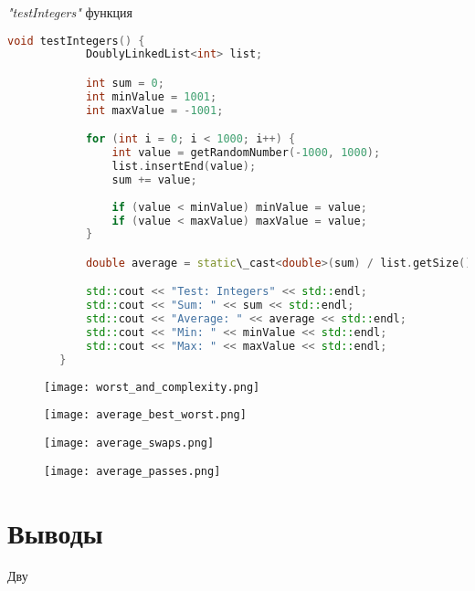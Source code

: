 \documentclass[12pt, a4paper]{report}
\begin{document}
	\par
	\textit{"testIntegers"} функция
	\lstset{style=mystyle}
	\begin{lstlisting}[language=C++]
		void testIntegers() {
			DoublyLinkedList<int> list;

			int sum = 0;
			int minValue = 1001;
			int maxValue = -1001;

			for (int i = 0; i < 1000; i++) {
				int value = getRandomNumber(-1000, 1000);
				list.insertEnd(value);
				sum += value;
				
				if (value < minValue) minValue = value;
				if (value < maxValue) maxValue = value;
			}

			double average = static\_cast<double>(sum) / list.getSize();

			std::cout << "Test: Integers" << std::endl;
			std::cout << "Sum: " << sum << std::endl;
			std::cout << "Average: " << average << std::endl;
			std::cout << "Min: " << minValue << std::endl;
			std::cout << "Max: " << maxValue << std::endl;
		}
	\end{lstlisting}

	\newpage
	\vfill

	\begin{figure}
		\texttt{[image: worst\_and\_complexity.png]}
	\end{figure}
	\begin{figure}
		\texttt{[image: average\_best\_worst.png]}
	\end{figure}
	\begin{figure}
		\texttt{[image: average\_swaps.png]}
	\end{figure}
	\begin{figure}
		\texttt{[image: average\_passes.png]}
	\end{figure}

	\vfill
	\clearpage
	
	\section*{Выводы}
	Дву
\end{document}
